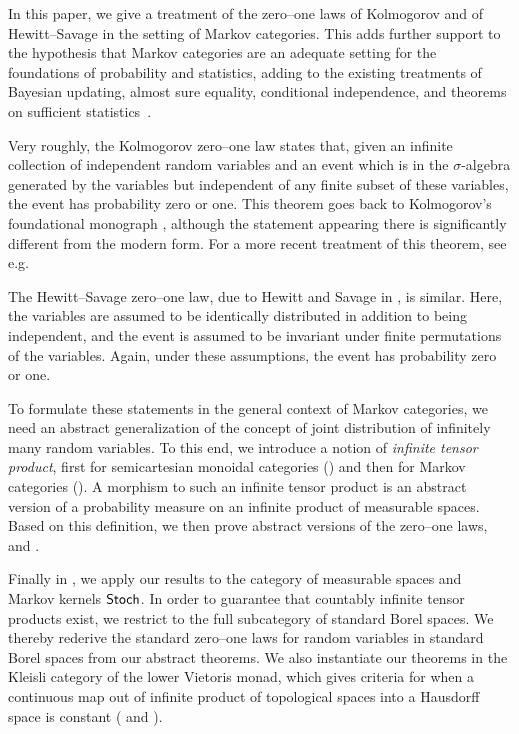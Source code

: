 \documentclass[11pt]{article}
\begin{document}
In this paper, we give a treatment of the zero--one laws of Kolmogorov and of Hewitt--Savage in the setting of Markov categories. This adds further support to the hypothesis that Markov categories are an adequate setting for the foundations of probability and statistics, adding to the existing treatments of Bayesian updating, almost sure equality, conditional independence, and theorems on sufficient statistics~\cite{cho_jacobs,markov_cats}.

Very roughly, the Kolmogorov zero--one law states that, given an infinite collection of independent random variables and an event which is in the $\sigma$-algebra generated by the variables but independent of any finite subset of these variables, the event has probability zero or one.
This theorem goes back to Kolmogorov's foundational monograph \cite{kolmogorovgerm}, although the statement appearing there is significantly different from the modern form.
For a more recent treatment of this theorem, see e.g. \cite[Theorem~2.37]{klenke}


The Hewitt--Savage zero--one law, due to Hewitt and Savage in \cite[Theorem~11.3]{hewitt_savage}, is similar. Here, the variables are assumed to be identically distributed in addition to being independent, and the event is assumed to be invariant under finite permutations of the variables. Again, under these assumptions, the event has probability zero or one.

To formulate these statements in the general context of Markov categories, we need an abstract generalization of the concept of joint distribution of infinitely many random variables.
To this end, we introduce a notion of \emph{infinite tensor product}, first for semicartesian monoidal categories () and then for Markov categories (). A morphism to such an infinite tensor product is an abstract version of a probability measure on an infinite product of measurable spaces. Based on this definition, we then prove abstract versions of the zero--one laws,  and .

Finally in , we apply our results to the category of measurable spaces and Markov kernels $\operatorname{\mathsf{Stoch}}$. In order to guarantee that countably infinite tensor products exist, we restrict to the full subcategory of standard Borel spaces. We thereby rederive the standard zero--one laws for random variables in standard Borel spaces from our abstract theorems. We also instantiate our theorems in the Kleisli category of the lower Vietoris monad, which gives criteria for when a continuous map out of infinite product of topological spaces into a Hausdorff space is constant ( and ).
\end{document}

